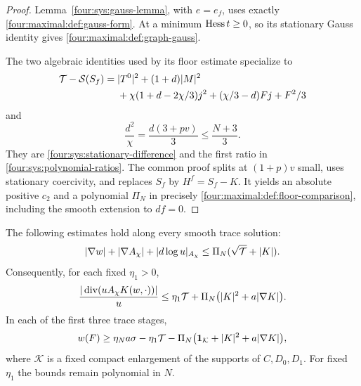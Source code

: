 \begin{proof}
Lemma~\ref{four:sys:gauss-lemma}, with $e=e_f$, uses exactly
\eqref{four:maximal:def:gauss-form}.  At a minimum $\operatorname{Hess} t\ge0$,
so its stationary Gauss identity gives
\eqref{four:maximal:def:graph-gauss}.

The two algebraic identities used by its floor estimate specialize to
\begin{align}\label{four:maximal:def:gauss-difference}
 \mathcal T-\mathcal S(S_f)
 ={}&|T^0|^2+(1+d)|M|^2\notag\\
 &+\chi(1+d-2\chi/3)j^2+(\chi/3-d)Fj+F^2/3
\end{align}
and
\begin{equation}\label{four:maximal:def:d-chi-ratio}
 \frac{d^2}{\chi}=\frac{d(3+pv)}3\le\frac{N+3}3.
\end{equation}
They are \eqref{four:sys:stationary-difference} and the first ratio
in \eqref{four:sys:polynomial-ratios}.  The common proof splits at
$(1+p)v$ small, uses stationary coercivity, and replaces $S_f$ by
$H^f=S_f-K$.  It yields an absolute positive $c_2$ and a polynomial
$\Pi_N$ in precisely \eqref{four:maximal:def:floor-comparison},
including the smooth extension to $df=0$.
\end{proof}

\begin{lemma}\label{four:maximal:def:coefficient-lemma}
The following estimates hold along every smooth trace solution:
\begin{equation}\label{four:maximal:def:derivative-bounds}
 |\nabla w|+|\nabla A_\chi|+|d\log u|_{A_\chi}
 \le\Pi_N(\sqrt{\mathcal T}+|K|).
\end{equation}
Consequently, for each fixed $\eta_1>0$,
\begin{equation}\label{four:maximal:def:drift-divergence}
 \frac{|\operatorname{div}(uA_\chi K(w,\cdot))|}{u}
 \le\eta_1\mathcal T+\Pi_N\bigl(|K|^2+a|\nabla K|\bigr).
\end{equation}
In each of the first three trace stages,
\begin{equation}\label{four:maximal:def:F-derivative}
 w(F)\ge\eta_N a\sigma-\eta_1\mathcal T
   -\Pi_N\bigl(\mathbf1_{\mathcal K}+|K|^2+a|\nabla K|\bigr),
\end{equation}
where $\mathcal K$ is a fixed compact enlargement of the supports of
$C,D_0,D_1$.  For fixed $\eta_1$ the bounds remain polynomial in $N$.
\end{lemma}

